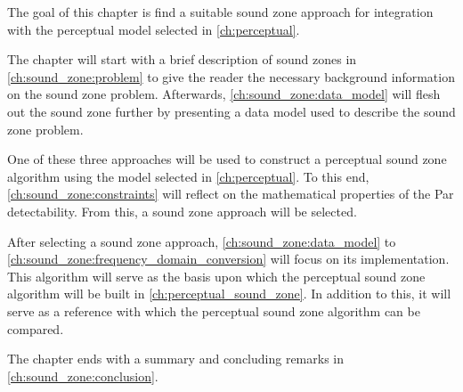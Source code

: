 The goal of this chapter is find a suitable sound zone approach for integration with the perceptual model selected in \autoref{ch:perceptual}.

The chapter will start with a brief description of sound zones in \autoref{ch:sound_zone:problem} to give the reader 
the necessary background information on the sound zone problem.
Afterwards, \autoref{ch:sound_zone:data_model} will flesh out the sound zone further by presenting a data model
used to describe the sound zone problem.

One of these three approaches will be used to construct a perceptual sound zone algorithm using the model selected in \autoref{ch:perceptual}.
To this end, \autoref{ch:sound_zone:constraints} will reflect on the mathematical properties of the Par detectability.
From this, a sound zone approach will be selected.

After selecting a sound zone approach, \autoref{ch:sound_zone:data_model} to \autoref{ch:sound_zone:frequency_domain_conversion} will focus on its implementation.
This algorithm will serve as the basis upon which the perceptual sound zone algorithm will be built in \autoref{ch:perceptual_sound_zone}.
In addition to this, it will serve as a reference with which the perceptual sound zone algorithm can be compared.

The chapter ends with a summary and concluding remarks in \autoref{ch:sound_zone:conclusion}.
